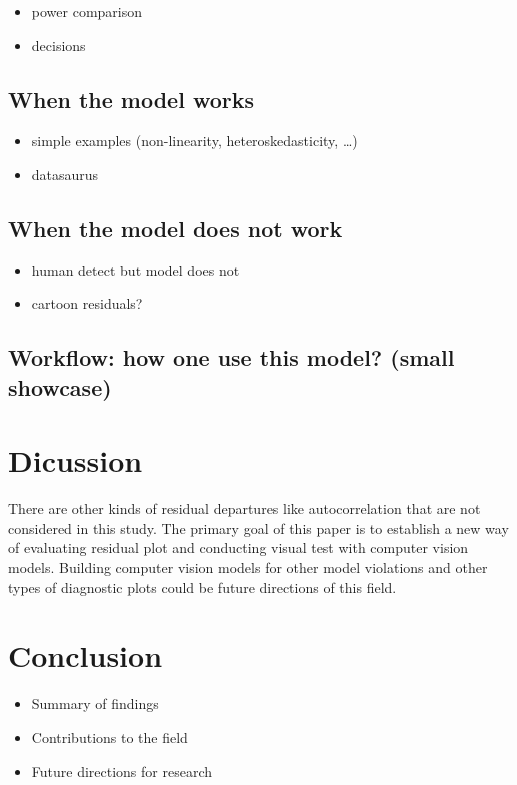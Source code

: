 \documentclass[]{interact}
\theoremstyle{plain}%
\theoremstyle{definition}
\theoremstyle{remark}
\providecommand{\tightlist}{%
  \setlength{\itemsep}{0pt}\setlength{\parskip}{0pt}}
\def\tightlist{}
\begin{document}
\begin{itemize}
\tightlist
\item
  power comparison
\item
  decisions
\end{itemize}

\hypertarget{when-the-model-works}{%
\subsection{When the model works}\label{when-the-model-works}}

\begin{itemize}
\tightlist
\item
  simple examples (non-linearity, heteroskedasticity, \ldots)
\item
  datasaurus
\end{itemize}

\hypertarget{when-the-model-does-not-work}{%
\subsection{When the model does not
work}\label{when-the-model-does-not-work}}

\begin{itemize}
\tightlist
\item
  human detect but model does not
\item
  cartoon residuals?
\end{itemize}

\hypertarget{workflow-how-one-use-this-model-small-showcase}{%
\subsection{Workflow: how one use this model? (small
showcase)}\label{workflow-how-one-use-this-model-small-showcase}}

\hypertarget{dicussion}{%
\section{Dicussion}\label{dicussion}}

There are other kinds of residual departures like autocorrelation that
are not considered in this study. The primary goal of this paper is to
establish a new way of evaluating residual plot and conducting visual
test with computer vision models. Building computer vision models for
other model violations and other types of diagnostic plots could be
future directions of this field.

\hypertarget{conclusion}{%
\section{Conclusion}\label{conclusion}}

\begin{itemize}
\tightlist
\item
  Summary of findings
\item
  Contributions to the field
\item
  Future directions for research
\end{itemize}



\end{document}
